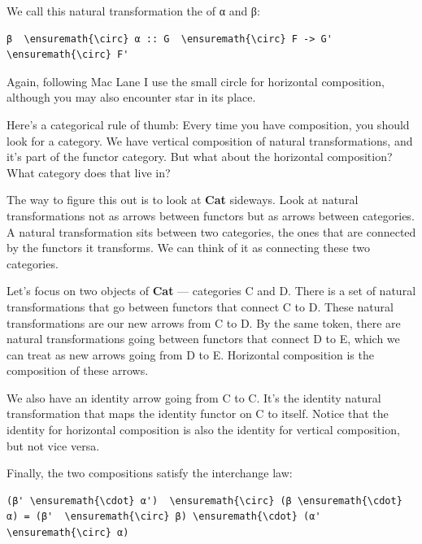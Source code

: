We call this natural transformation the  of
α and β:

\begin{Verbatim}[commandchars=\\\{\}]
β  \ensuremath{\circ} α :: G  \ensuremath{\circ} F -> G'  \ensuremath{\circ} F'
\end{Verbatim}
Again, following Mac Lane I use the small circle for horizontal
composition, although you may also encounter star in its place.

Here's a categorical rule of thumb: Every time you have composition, you
should look for a category. We have vertical composition of natural
transformations, and it's part of the functor category. But what about
the horizontal composition? What category does that live in?

The way to figure this out is to look at \textbf{Cat} sideways. Look at
natural transformations not as arrows between functors but as arrows
between categories. A natural transformation sits between two
categories, the ones that are connected by the functors it transforms.
We can think of it as connecting these two categories.

\begin{figure}[H]
\centering
{}
\end{figure}

\noindent
Let's focus on two objects of \textbf{Cat} --- categories C and D. There
is a set of natural transformations that go between functors that
connect C to D. These natural transformations are our new arrows from C
to D. By the same token, there are natural transformations going between
functors that connect D to E, which we can treat as new arrows going
from D to E. Horizontal composition is the composition of these arrows.

We also have an identity arrow going from C to C. It's the identity
natural transformation that maps the identity functor on C to itself.
Notice that the identity for horizontal composition is also the identity
for vertical composition, but not vice versa.

Finally, the two compositions satisfy the interchange law:

\begin{Verbatim}[commandchars=\\\{\}]
(β' \ensuremath{\cdot} α')  \ensuremath{\circ} (β \ensuremath{\cdot} α) = (β'  \ensuremath{\circ} β) \ensuremath{\cdot} (α'  \ensuremath{\circ} α)
\end{Verbatim}

